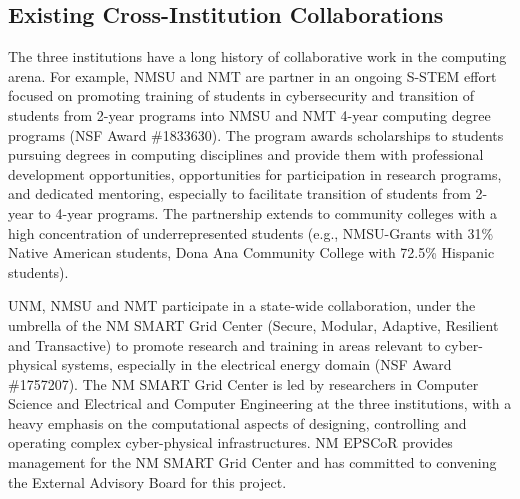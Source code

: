  


\subsection{Existing Cross-Institution Collaborations}
The three institutions have a long history of collaborative work in the computing arena. For example, NMSU and NMT are partner in an ongoing S-STEM effort focused on promoting training of students in cybersecurity and transition of students from 2-year programs into NMSU and NMT 4-year computing degree programs (NSF Award \#1833630). The program awards scholarships to students pursuing degrees in computing disciplines and provide them with professional development opportunities, opportunities for participation in research programs, and dedicated mentoring, especially to facilitate transition of students from 2-year to 4-year programs. The partnership extends to community colleges with a high concentration of underrepresented students (e.g., NMSU-Grants with 31\% Native American students, Dona Ana Community College with 72.5\% Hispanic students).

UNM, NMSU and NMT participate in a state-wide collaboration, under the umbrella of the NM SMART Grid Center (Secure, Modular, Adaptive, Resilient and Transactive) to promote research and training in areas relevant to cyber-physical systems, especially in the electrical energy domain (NSF Award \#1757207). The NM SMART Grid Center is led by researchers in Computer Science and Electrical and Computer Engineering at the three institutions, with a heavy emphasis on the computational aspects of designing, controlling and operating complex cyber-physical infrastructures. NM EPSCoR provides management for the NM SMART Grid Center and has committed to convening the External Advisory Board for this project.
